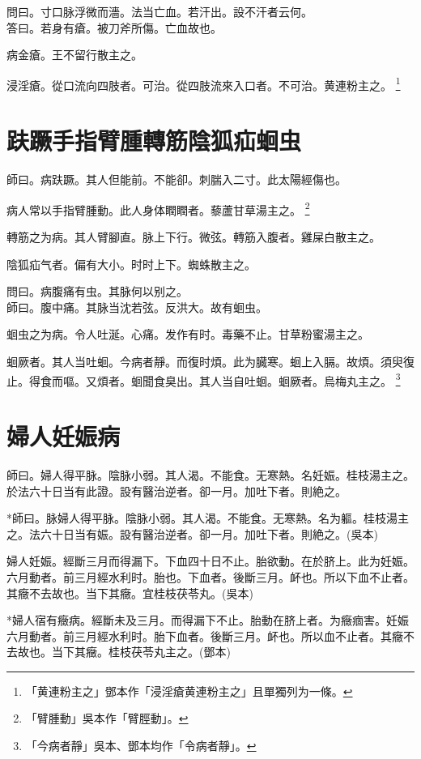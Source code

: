 \documentclass[12pt,twoside,UTF8,b5paper]{ctexbook}
\begin{document}
問曰。寸口脉浮微而濇。法当亡血。若汗出。設不汗者云何。\\
答曰。若身有瘡。被刀斧所傷。亡血故也。

病金瘡。王不留行散主之。

浸淫瘡。從口流向四肢者。可治。從四肢流來入口者。不可治。黄連粉主之。
	\footnote{「黄連粉主之」鄧本作「浸淫瘡黄連粉主之」且單獨列为一條。}

\chapter{趺蹶手指臂腫轉筋陰狐疝蛔虫}

師曰。病趺蹶。其人但能前。不能卻。刺腨入二寸。此太陽經傷也。

病人常以手指臂腫動。此人身体瞤瞤者。藜蘆甘草湯主之。
	\footnote{「臂腫動」吳本作「臂脛動」。}

轉筋之为病。其人臂腳直。脉上下行。微弦。轉筋入腹者。雞屎白散主之。

陰狐疝气者。偏有大小。时时上下。蜘蛛散主之。

問曰。病腹痛有虫。其脉何以别之。\\
師曰。腹中痛。其脉当沈若弦。反洪大。故有蛔虫。

蛔虫之为病。令人吐涎。心痛。发作有时。毒藥不止。甘草粉蜜湯主之。

蛔厥者。其人当吐蛔。今病者靜。而復时煩。此为臓寒。蛔上入膈。故煩。須臾復止。得食而嘔。又煩者。蛔聞食臭出。其人当自吐蛔。蛔厥者。烏梅丸主之。
	\footnote{「今病者靜」吳本、鄧本均作「令病者靜」。}

\chapter{婦人妊娠病}

師曰。婦人得平脉。陰脉小弱。其人渴。不能食。无寒熱。名妊娠。桂枝湯主之。於法六十日当有此證。設有醫治逆者。卻一月。加吐下者。則絶之。

*師曰。脉婦人得平脉。陰脉小弱。其人渴。不能食。无寒熱。名为軀。桂枝湯主之。法六十日当有娠。設有醫治逆者。卻一月。加吐下者。則絶之。(吳本)

婦人妊娠。經斷三月而得漏下。下血四十日不止。胎欲動。在於脐上。此为妊娠。六月動者。前三月經水利时。胎也。下血者。後斷三月。衃也。所以下血不止者。其癥不去故也。当下其癥。宜桂枝茯苓丸。(吳本)

*婦人宿有癥病。經斷未及三月。而得漏下不止。胎動在脐上者。为癥痼害。妊娠六月動者。前三月經水利时。胎下血者。後斷三月。衃也。所以血不止者。其癥不去故也。当下其癥。桂枝茯苓丸主之。(鄧本)
\end{document}
